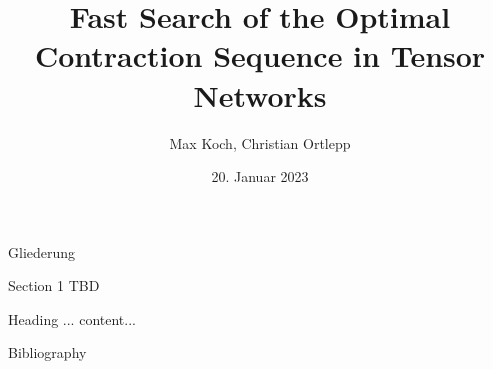 \documentclass{beamer}
\title{Fast Search of the Optimal Contraction Sequence in Tensor Networks}
\author{Max Koch, Christian Ortlepp}
\institute{Friedrich-Schiller-Universität Jena}
\date{20. Januar 2023}
\begin{document}
	
	\maketitle
	\begin{frame}{Gliederung}
		\tableofcontents
	\end{frame}
	
	\begin{section}{Section 1 TBD}
		\begin{frame}{Heading ...}
			content...
		\end{frame}
	\end{section}
	
	
	
	\begin{frame}[allowframebreaks]{Bibliography}
		
		
	\end{frame}
	
\end{document}
